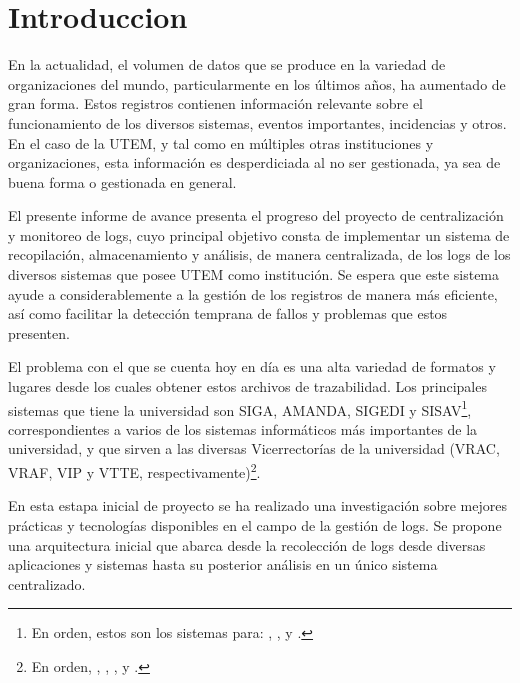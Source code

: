 
\section{Introduccion}

En la actualidad, el volumen de datos que se produce en la variedad de organizaciones del mundo, particularmente en los últimos años, ha aumentado de gran forma. Estos registros contienen información relevante sobre el funcionamiento de los diversos sistemas, eventos importantes, incidencias y otros. En el caso de la UTEM, y tal como en múltiples otras instituciones y organizaciones, esta información es desperdiciada al no ser gestionada, ya sea de buena forma o gestionada en general.

El presente informe de avance presenta el progreso del proyecto de centralización y monitoreo de logs, cuyo principal objetivo consta de implementar un sistema de recopilación, almacenamiento y análisis, de manera centralizada, de los logs de los diversos sistemas que posee UTEM como institución. Se espera que este sistema ayude a considerablemente a la gestión de los registros de manera más eficiente, así como facilitar la detección temprana de fallos y problemas que estos presenten.

El problema con el que se cuenta hoy en día es una alta variedad de formatos y lugares desde los cuales obtener estos archivos de trazabilidad. Los principales sistemas que tiene la universidad son SIGA, AMANDA, SIGEDI y SISAV\footnote{En orden, estos son los sistemas para: , ,  y .}, correspondientes a varios de los sistemas informáticos más importantes de la universidad, y que sirven a las diversas Vicerrectorías de la universidad (VRAC, VRAF, VIP y VTTE, respectivamente)\footnote{En orden, , , , y .}.

En esta estapa inicial de proyecto se ha realizado una investigación sobre mejores prácticas y tecnologías disponibles en el campo de la gestión de logs. Se propone una arquitectura inicial que abarca desde la recolección de logs desde diversas aplicaciones y sistemas hasta su posterior análisis en un único sistema centralizado.

